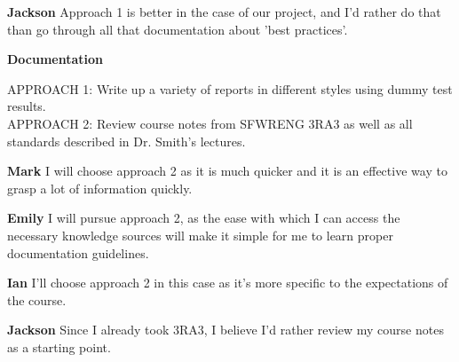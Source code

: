 \documentclass[12pt, titlepage]{article}
\begin{document}
\begin{enumerate}[leftmargin=*]
  \textbf{Jackson} Approach 1 is better in the case of our project, and I'd rather do that than go through all that 
  documentation about 'best practices'.

  \vspace{10pt}
  \textbf{Documentation}

  APPROACH 1: Write up a variety of reports in different styles using dummy test results. \\
  APPROACH 2: Review course notes from SFWRENG 3RA3 as well as all standards described in Dr. Smith’s lectures.

  \textbf{Mark} I will choose approach 2 as it is much quicker and it is an effective way to grasp a lot of information quickly.

  \textbf{Emily} I will pursue approach 2, as the ease with which I can access the necessary knowledge sources will make 
  it simple for me to learn proper documentation guidelines.

  \textbf{Ian} I’ll choose approach 2 in this case as it’s more specific to the expectations of the course.

  \textbf{Jackson} Since I already took 3RA3, I believe I'd rather review my course notes as a starting point.

\end{enumerate}
\end{document}
